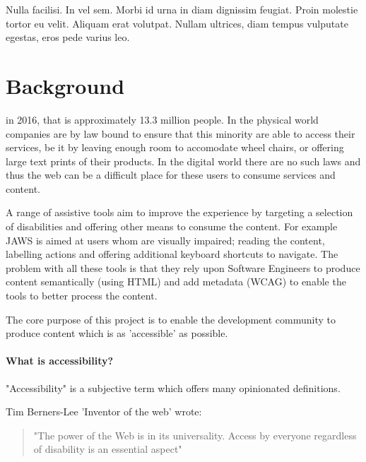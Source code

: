 \begin{savequote}[75mm]
Nulla facilisi. In vel sem. Morbi id urna in diam dignissim feugiat. Proin molestie tortor eu velit. Aliquam erat volutpat. Nullam ultrices, diam tempus vulputate egestas, eros pede varius leo.
\end{savequote}

\chapter{Background}
 in
2016, that is
approximately 13.3 million people. In the physical world companies are by law
bound to ensure that this minority are able to access their services, be it by
leaving enough room to accomodate wheel chairs, or offering large text prints
of their products. In the digital world there are no such laws and thus the web can be a
difficult place for these users to consume services and content.

A range of assistive
tools aim to improve the experience by targeting a selection of
disabilities and offering other means to consume the content. For example
JAWS is aimed at users whom are visually impaired; reading the content,
labelling actions and offering additional keyboard shortcuts to navigate. The
problem
with all these tools is that they rely upon Software Engineers to produce
content semantically (using HTML) and add metadata (WCAG) to enable the tools
to better process the content.

The core purpose of this project is to enable the development community to
produce content which is as 'accessible' as possible.

\subsubsection{What is accessibility?}
"Accessibility" is a subjective term which offers many opinionated
definitions.

Tim Berners-Lee 'Inventor of the web' wrote:
\begin{quote}
"The power of the Web is in its universality. Access by everyone regardless
of disability is an essential aspect"
\end{quote}

